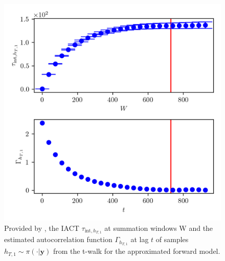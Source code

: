 \begin{figure}[ht!]
	\centering
	\includegraphics{UwerrTauIntTWalk3.png}
	\caption[IACT and autocorrelation function of samples $h_{T,1} \sim \pi(\cdot|\bm{y})$, for approximated model.]{Provided by \cite{drikHesse}, the IACT $\tau_{\text{int},h_{T,1}}$ at summation windows W and the estimated autocorrelation function $\Gamma_{h_{T,1}}$ at lag $t$ of samples $h_{T,1} \sim \pi( \cdot| \bm{y})$ from the t-walk for the approximated forward model.}
	\label{fig:TWalkIATC4}
\end{figure}


